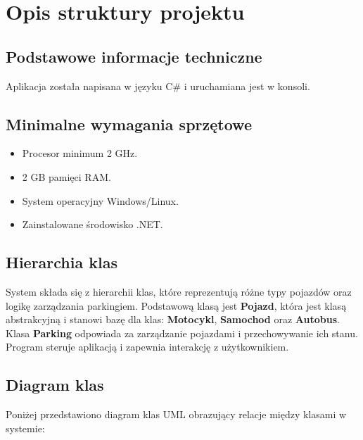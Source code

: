 ﻿%
\chapter{Opis struktury projektu}
\section{Podstawowe informacje techniczne}
Aplikacja została napisana w języku C\# i uruchamiana jest w konsoli.

\section{Minimalne wymagania sprzętowe}
\begin{itemize}
    \item Procesor minimum 2 GHz.
    \item 2 GB pamięci RAM.
    \item System operacyjny Windows/Linux.
    \item Zainstalowane środowisko .NET.
\end{itemize}

\section{Hierarchia klas}

System składa się z hierarchii klas, które reprezentują różne typy pojazdów oraz logikę zarządzania parkingiem. 
Podstawową klasą jest \textbf{Pojazd}, która jest klasą abstrakcyjną i stanowi bazę dla klas: \textbf{Motocykl}, \textbf{Samochod} oraz \textbf{Autobus}. 
Klasa \textbf{Parking} odpowiada za zarządzanie pojazdami i przechowywanie ich stanu. 
Program steruje aplikacją i zapewnia interakcję z użytkownikiem.

\section{Diagram klas}

Poniżej przedstawiono diagram klas UML obrazujący relacje między klasami w systemie:

